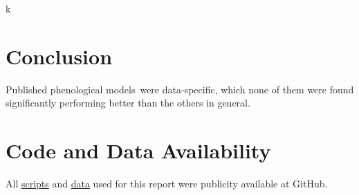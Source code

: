 \documentclass[a4paper, 11pt]{article}
\newcommand{\pms}{phenological models}
\begin{document}
	k
	
	\section*{Conclusion}
	Published \pms\ were data-specific, which none of them were found significantly performing better than the others in general.
	
	\section*{Code and Data Availability}
	All \href{https://github.com/ph-u/CMEECourseWork_pmH/tree/master/MiniProject/code}{scripts} and \href{https://github.com/ph-u/CMEECourseWork_pmH/tree/master/MiniProject/data}{data} used for this report were publicity available at GitHub.
	\nocite{*}\printbibliography
\end{document}
